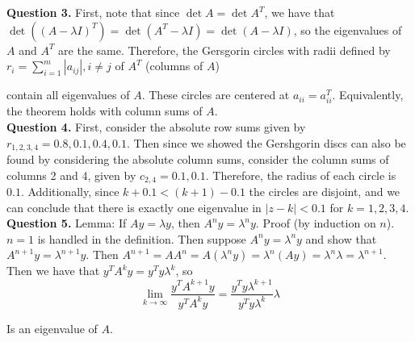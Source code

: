\documentclass{article}
\newcommand{\ra}{\longrightarrow}
\begin{document}

\textbf{Question 3.} First, note that since $\det A = \det A^T$, we have that $\det((A-\lambda I)^T) = \det(A^T - \lambda I)=\det(A - \lambda I)$, so the eigenvalues of $A$ and $A^T$ are the same. Therefore, the Gersgorin circles with radii defined by $r_i=\sum_{i=1}^m |a_{ij}|, i\neq j$ of $A^T$ (columns of $A$) 

contain all eigenvalues of $A$. These circles are centered at $a_{ii}=a^T_{ii}$. Equivalently, the theorem holds with column sums of $A$.\\

\textbf{Question 4.} First, consider the absolute row sums given by $r_{1,2,3,4} = 0.8, 0.1, 0.4, 0.1$. Then since we showed the Gershgorin discs can also be found by considering the absolute column sums, consider the column sums of columns 2 and 4, given by $c_{2,4} = 0.1, 0.1$. Therefore, the radius of each circle is $0.1$. Additionally, since $k+0.1<(k+1)-0.1$ the circles are disjoint, and we can conclude that there is exactly one eigenvalue in $|z-k| < 0.1$ for $k=1,2,3,4$. \\

\textbf{Question 5.} Lemma: If $Ay = \lambda y $, then $A^n y = \lambda^n y$. Proof (by induction on $n$). $n=1$ is handled in the definition. Then suppose $A^n y = \lambda^n y$ and show that $A^{n+1}y= \lambda^{n+1}y$. Then $A^{n+1}=AA^n = A(\lambda^n y) = \lambda^n (Ay) = \lambda^n \lambda = \lambda^{n+1}$. Then we have that $y^T A^k y = y^T y\lambda^k$, so 
\begin{equation*}
    \lim_{k \ra \infty} \frac{y^T A^{k+1}y}{y^T A^k y} = \frac{y^T y \lambda^{k+1}}{y^T y \lambda^k} \lambda 
\end{equation*}

Is an eigenvalue of $A$. \\
\end{document}
